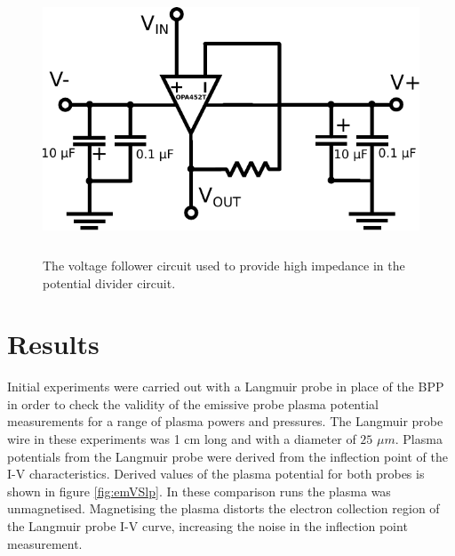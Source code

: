 \begin{figure}[H]
\centering
\includegraphics[width=1.0\textwidth, height = 8cm]{op_amp.pdf}
\caption{The voltage follower circuit used to provide high impedance in the potential divider circuit. }
\label{fig:follow}
\end{figure}





\section{Results}
Initial experiments were carried out with a Langmuir probe in place of the BPP in order to check the validity of the emissive probe plasma potential measurements for a range of plasma powers and pressures. The Langmuir probe wire in these experiments was 1 cm long and with a diameter of $25$ $\mu m$. Plasma potentials from the Langmuir probe were derived from the inflection point of the I-V characteristics. Derived values of the plasma potential for both probes is shown in figure \ref{fig:emVSlp}. In these comparison runs the plasma was unmagnetised. Magnetising the plasma distorts the electron collection region of the Langmuir probe I-V curve, increasing the noise in the inflection point measurement.

